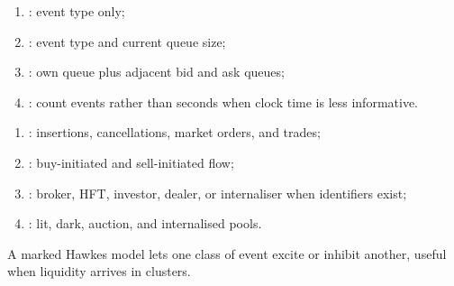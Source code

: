\documentclass[a4paper,oneside,openany]{book}
\begin{document}
\begin{taxonomy} 
\begin{enumerate}[label=\roman*.]
\setlength{\itemsep}{0pt}
\item {}: event type only;
\item {}: event type and current queue size;
\item {}: own queue plus adjacent bid and ask queues;
\item {}: count events rather than seconds when clock time is less informative.
\end{enumerate}
\end{taxonomy}

\begin{taxonomy} 
\begin{enumerate}[label=\roman*.]
\setlength{\itemsep}{0pt}
\item {}: insertions, cancellations, market orders, and trades;
\item {}: buy-initiated and sell-initiated flow;
\item {}: broker, HFT, investor, dealer, or internaliser when identifiers exist;
\item {}: lit, dark, auction, and internalised pools.
\end{enumerate}
A marked Hawkes model lets one class of event excite or inhibit another, useful when liquidity arrives in clusters.
\end{taxonomy}
\end{document}
